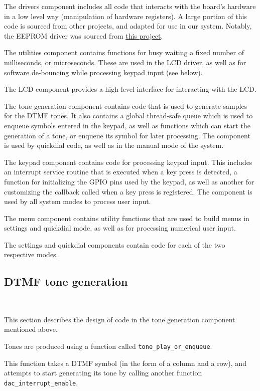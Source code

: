\documentclass[11pt,a4paper,twocolumn]{scrartcl}
\begin{document}
The drivers component includes all code that interacts with the board's hardware in a low level way (manipulation of hardware registers). A large portion of this code is sourced from other projects, and adapted for use in our system. Notably, the EEPROM driver was sourced from \href{https://github.com/RT-Thread/realboard-lpc4088/tree/master/software/lpcware_lpc408x/Drivers}{this project}.

The utilities component contains functions for busy waiting a fixed number of milliseconds, or microseconds. These are used in the LCD driver, as well as for software de-bouncing while processing keypad input (see below).

The LCD component provides a high level interface for interacting with the LCD.

The tone generation component contains code that is used to generate samples for the DTMF tones. It also contains a global thread-safe queue which is used to enqueue symbols entered in the keypad, as well as functions which can start the generation of a tone, or enqueue its symbol for later processing. The component is used by quickdial code, as well as in the manual mode of the system.

The keypad component contains code for processing keypad input. This includes an interrupt service routine that is executed when a key press is detected, a function for initializing the GPIO pins used by the keypad, as well as another for customizing the callback called when a key press is registered. The component is used by all system modes to process user input.

The menu component contains utility functions that are used to build menus in settings and quickdial mode, as well as for processing numerical user input.

The settings and quickdial components contain code for each of the two respective modes.

\subsection{DTMF tone generation}~\label{dac}

This section describes the design of code in the tone generation component mentioned above.

Tones are produced using a function called \verb!tone_play_or_enqueue!. 

This function takes a DTMF symbol (in the form of a column and a row), and attempts to start generating its tone by calling another function \verb!dac_interrupt_enable!.
\end{document}
